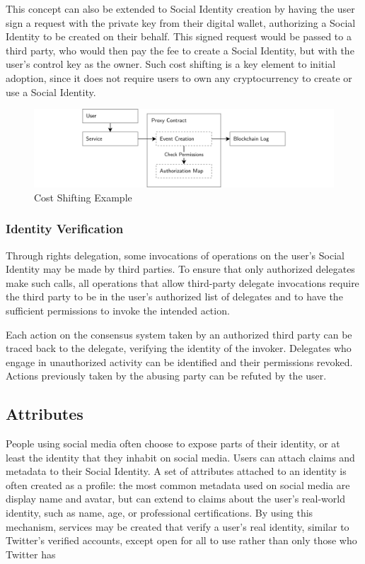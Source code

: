 \documentclass[12pt,letterpaper]{article}
\begin{document}
This concept can also be extended to Social Identity creation by having the user sign a
request with the private key from their digital wallet, authorizing a Social Identity to be
created on their behalf. This signed request would be passed to a third party, who would
then pay the fee to create a Social Identity, but with the user's control key as the
owner. Such cost shifting is a key element to initial adoption, since it does not require
users to own any cryptocurrency to create or use a Social Identity.

\begin{figure}
	\includegraphics[width=\linewidth]{figures/Cost Shifting.png}
	\caption{Cost Shifting Example}
	\label{fig:2}
\end{figure}

\subsubsection{Identity Verification}

Through rights delegation, some invocations of operations on the user's Social Identity may
be made by third parties. To ensure that only authorized delegates make such calls, all
operations that allow third-party delegate invocations require the third party to be in the
user's authorized list of delegates and to have the sufficient permissions to invoke the
intended action.

Each action on the consensus system taken by an authorized third party can be traced back to
the delegate, verifying the identity of the invoker. Delegates who engage in unauthorized
activity can be identified and their permissions revoked. Actions previously taken by the
abusing party can be refuted by the user.

\subsection{Attributes}\label{sec:attributes}

People using social media often choose to expose parts of their identity, or at least the
identity that they inhabit on social media. Users can attach claims and metadata to their
Social Identity. A set of attributes attached to an identity is often created as a profile:
the most common metadata used on social media are display name and avatar,
but can extend to claims about the user's real-world identity, such as name, age, or
professional certifications. By using this mechanism, services may be created that verify a
user's real identity, similar to Twitter's verified accounts, except open for all to use rather
than only those who Twitter has \cite{twitter_verified_accounts}
\end{document}
